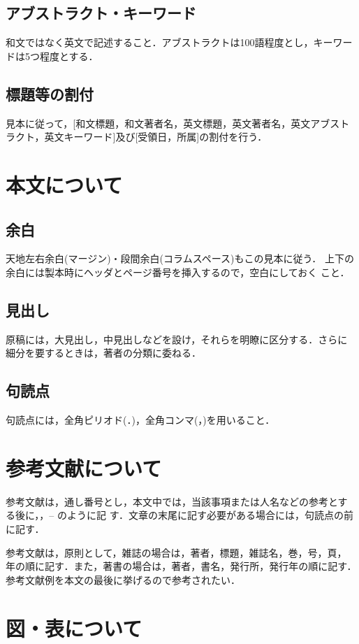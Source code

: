 \documentclass[a4j, 12Q, twocolumn, twoside]{jsarticle}
\begin{document}
\subsection{アブストラクト・キーワード}
和文ではなく英文で記述すること．アブストラクトは100語程度とし，キーワー
ドは5つ程度とする．

\subsection{標題等の割付}
見本に従って，[和文標題，和文著者名，英文標題，英文著者名，英文アブスト
ラクト，英文キーワード]及び[受領日，所属]の割付を行う．

\section{本文について}

\subsection{余白}
天地左右余白(マージン)・段間余白(コラムスペース)もこの見本に従う．
上下の余白には製本時にヘッダとページ番号を挿入するので，空白にしておく
こと．

\subsection{見出し}
原稿には，大見出し，中見出しなどを設け，それらを明瞭に区分する．さらに
細分を要するときは，著者の分類に委ねる．

\subsection{句読点}
句読点には，全角ピリオド(．)，全角コンマ(，)を用いること．


\section{参考文献について}
参考文献は，通し番号とし，本文中では，当該事項または人名などの参考とす
る後に，\cite{TRA96HuHaCo}，\cite{SICE02Yo}--\cite{Asa02Ar} のように記
す．文章の末尾に記す必要がある場合には，句読点の前に記す．

参考文献は，原則として，雑誌の場合は，著者，標題，雑誌名，巻，号，頁，
年の順に記す．また，著書の場合は，著者，書名，発行所，発行年の順に記す．
参考文献例を本文の最後に挙げるので参考されたい．

\section{図・表について}
\end{document}
